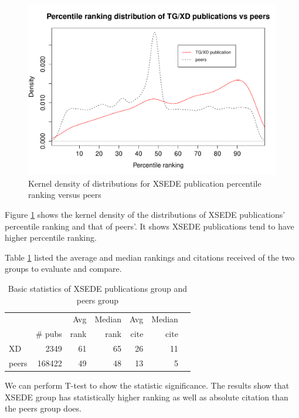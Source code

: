 \documentclass{sig-alternate}
\begin{document}
\begin{figure}[htb]
  \centering 
    \includegraphics[width=1.0\columnwidth]{images-new/xd_peers_density.pdf} 
  \caption{Kernel density of distributions for XSEDE publication percentile ranking versus peers}\label{F:xd_peers_density} 
\end{figure}

Figure \ref{F:xd_peers_density} shows the kernel density of the
distributions of XSEDE publications' percentile ranking and that of
peers'. It shows XSEDE publications tend to have higher percentile
ranking.

Table \ref{T:groups_stats} listed the average and median rankings and
citations received of the two groups to evaluate and compare.

\begin{table}[h]
\caption{Basic statistics of XSEDE publications group and peers group}
\label{T:groups_stats}
\centering
\begin{small}
\begin{tabular}{p{}rrrrrr}
 &  & Avg & Median & Avg & Median \\
 & \# pubs & rank & rank & cite & cite \\
\hline
XD & 2349	& 61	& 65	& 26	& 11 \\
peers & 168422	& 49	& 48	& 13	& 5 \\
\end{tabular}
\end{small}
\end{table}

We can perform T-test to show the statistic significance. The results
show that XSEDE group has statistically higher ranking as well as
absolute citation than the peers group does.
\end{document}
